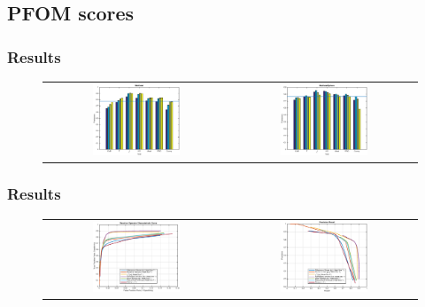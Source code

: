 \documentclass[9pt]{beamer}
\begin{document}
\subsection{PFOM scores}
		\begin{frame}
			\frametitle{Results}
			\begin{figure}
\begin{tabular}{c c}
\includegraphics[width=0.49\textwidth]{PFOMmulti.eps}&\includegraphics[width=0.49\textwidth]{PFOMsphere.eps}
\end{tabular}
\end{figure}
	\end{frame}
			\begin{frame}
			\frametitle{Results}
			\begin{figure}
\begin{tabular}{c c}
\includegraphics[width=0.49\textwidth]{ROC1.eps}&\includegraphics[width=0.49\textwidth]{PR1.eps}
\end{tabular}
\end{figure}
	\end{frame}
\end{document}
